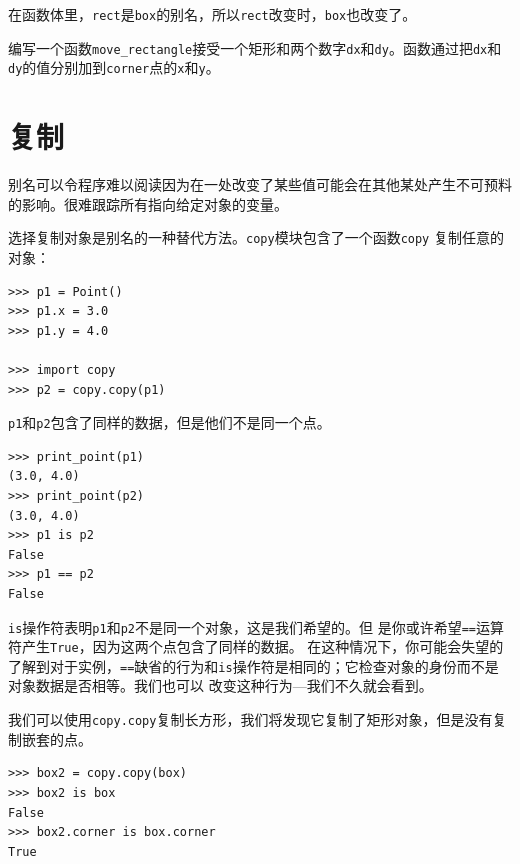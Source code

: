 在函数体里，{\tt rect}是{\tt box}的别名，所以{\tt rect}改变时，{\tt box}也改变了。

\begin{ex}

编写一个函数\verb"move_rectangle"接受一个矩形和两个数字{\tt dx}和{\tt dy}。函数通过把{\tt dx}和{\tt dy}的值分别加到{\tt corner}点的{\tt x}和{\tt y}。
\end{ex}

\section{复制}


别名可以令程序难以阅读因为在一处改变了某些值可能会在其他某处产生不可预料的影响。很难跟踪所有指向给定对象的变量。


选择复制对象是别名的一种替代方法。{\tt copy}模块包含了一个函数{\tt copy}
复制任意的对象：

\beforeverb
\begin{verbatim}
>>> p1 = Point()
>>> p1.x = 3.0
>>> p1.y = 4.0

>>> import copy
>>> p2 = copy.copy(p1)
\end{verbatim}
\afterverb

{\tt p1}和{\tt p2}包含了同样的数据，但是他们不是同一个点。

\beforeverb
\begin{verbatim}
>>> print_point(p1)
(3.0, 4.0)
>>> print_point(p2)
(3.0, 4.0)
>>> p1 is p2
False
>>> p1 == p2
False
\end{verbatim}
\afterverb

{\tt is}操作符表明{\tt p1}和{\tt p2}不是同一个对象，这是我们希望的。但
是你或许希望{\tt ==}运算符产生{\tt True}，因为这两个点包含了同样的数据。
在这种情况下，你可能会失望的了解到对于实例，{\tt ==}缺省的行为和{\tt is}操作符是相同的；它检查对象的身份而不是对象数据是否相等。我们也可以
改变这种行为---我们不久就会看到。


我们可以使用{\tt copy.copy}复制长方形，我们将发现它复制了矩形对象，但是没有复制嵌套的点。


\beforeverb
\begin{verbatim}
>>> box2 = copy.copy(box)
>>> box2 is box
False
>>> box2.corner is box.corner
True
\end{verbatim}
\afterverb

